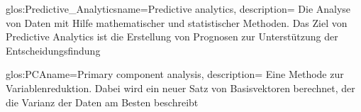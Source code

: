 


\newglossaryentry
{glos:Predictive_Analytics}{name=Predictive analytics, description=
{Die Analyse von Daten mit Hilfe mathematischer und statistischer Methoden.
Das Ziel von Predictive Analytics ist die Erstellung von Prognosen zur
Unterstützung der Entscheidungsfindung}
}

\newglossaryentry
{glos:PCA}{name=Primary component analysis, description=
{Eine Methode zur Variablenreduktion. Dabei wird ein neuer Satz von
Basisvektoren berechnet, der die Varianz der Daten am Besten beschreibt}
}
